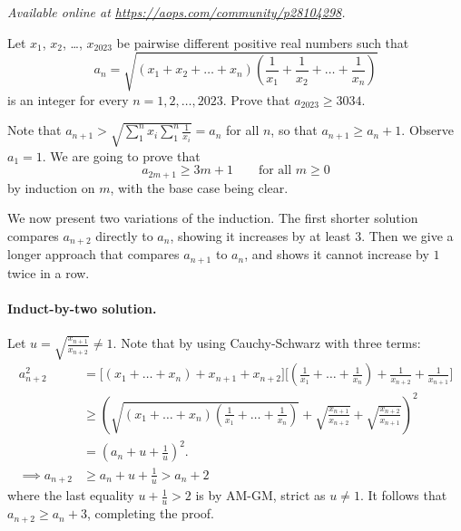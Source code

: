 \textsl{Available online at \url{https://aops.com/community/p28104298}.}
\begin{mdframed}[style=mdpurplebox,frametitle={Problem statement}]
Let $x_1$, $x_2$, \dots, $x_{2023}$ be pairwise different positive real numbers such that
\[ a_n = \sqrt{(x_1+x_2+\dots+x_n)
  \left(\frac{1}{x_1}+\frac{1}{x_2}+\dots+\frac{1}{x_n}\right)} \]
is an integer for every $n=1,2,\dots,2023$. Prove that $a_{2023} \geq 3034$.
\end{mdframed}
Note that $a_{n+1} > \sqrt{\sum_1^n x_i \sum_1^n \frac{1}{x_i}} = a_n$ for all $n$,
so that $a_{n+1} \geq a_n + 1$.
Observe $a_1 = 1$.
We are going to prove that \[ a_{2m+1} \geq 3m+1 \qquad \text{for all } m \geq 0 \]
by induction on $m$, with the base case being clear.

We now present two variations of the induction.
The first shorter solution compares $a_{n+2}$ directly to $a_n$,
showing it increases by at least $3$.
Then we give a longer approach that compares $a_{n+1}$ to $a_n$,
and shows it cannot increase by $1$ twice in a row.

\paragraph{Induct-by-two solution.}
Let $u = \sqrt{\frac{x_{n+1}}{x_{n+2}}} \neq 1$.
Note that by using Cauchy-Schwarz with three terms:
\begin{align*}
  a_{n+2}^2 &= \Bigg[ (x_1+\dots+x_n)+x_{n+1}+x_{n+2} \Bigg]
    \Bigg[ \left(\frac{1}{x_1}+\dots+\frac{1}{x_n}\right)
    +\frac{1}{x_{n+2}} + \frac{1}{x_{n+1}} \Bigg] \\
  &\geq \left( \sqrt{ (x_1+\dots+x_n)\left(\frac{1}{x_1}+\dots+\frac{1}{x_n}\right)}
    + \sqrt{\frac{x_{n+1}}{x_{n+2}}} + \sqrt{\frac{x_{n+2}}{x_{n+1}}} \right)^2 \\
  &= \left( a_n + u + \frac 1u \right)^2. \\
  \implies a_{n+2} &\ge a_n + u + \frac 1u > a_n + 2
\end{align*}
where the last equality $u + \frac 1u > 2$ is by AM-GM, strict as $u \neq 1$.
It follows that $a_{n+2} \geq a_n + 3$, completing the proof.

